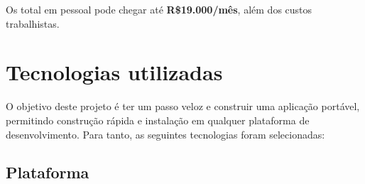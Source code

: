 \documentclass[12pt,a4paper,twoside,hyphens,english,brazil]{abntex2}
\begin{document}
Os total em pessoal pode chegar até \textbf{R\$19.000/mês}, além dos custos trabalhistas.


\section{Tecnologias utilizadas} \label{sec:tecnologias}

O objetivo deste projeto é ter um passo veloz e construir uma aplicação portável, permitindo construção rápida e instalação em qualquer plataforma de desenvolvimento. Para tanto, as seguintes tecnologias foram selecionadas:

\subsection{Plataforma}
\end{document}
